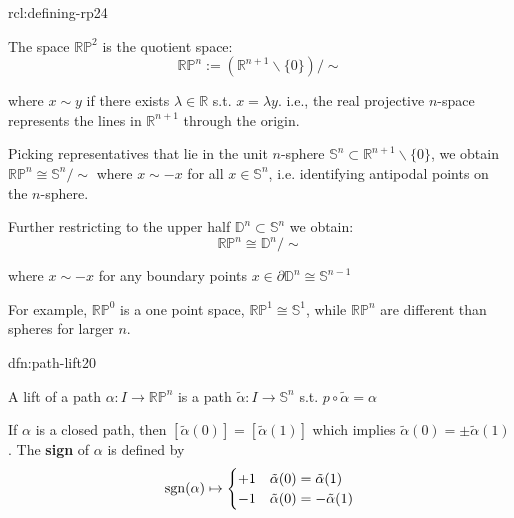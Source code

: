 \documentclass[landscape, 8pt]{extarticle}
\begin{document}
\begin{multicols*}{3}

\vspace{-7pt}
\begin{rcl}{rcl:defining-rp2}{4}
	\vspace{-2pt}
	\begin{enumerate-zero}
	    \item The space $\mathbb{RP}^{2}$ is the quotient space:
			\[\mathbb{RP}^{n} := (\mathbb{R}^{n+1} \backslash \{0\}) / \sim\]
			\par\vspace{-5pt}
			where $x \sim y$ if there exists $\lambda \in \mathbb{R}$ s.t. $x = \lambda y$. i.e., the real projective $n$-space represents the lines in $\mathbb{R}^{n+1}$ through the origin.
			\item Picking representatives that lie in the unit $n$-sphere $\mathbb{S}^{n} \subset \mathbb{R}^{n+1} \backslash \{0\}$, we obtain
				$\mathbb{RP}^{n} \cong \mathbb{S}^{n} / \sim$
				where $x \sim -x$ for all $x\in \mathbb{S}^{n}$, i.e. identifying antipodal points on the $n$-sphere.
			\item Further restricting to the upper half $\mathbb{D}^{n} \subset \mathbb{S}^{n}$ we obtain:
				\[\mathbb{RP}^{n} \cong \mathbb{D}^{n} / \sim\]
				\par\vspace{-6pt}
				where $x \sim -x$ for any boundary points $x\in \partial \mathbb{D}^{n} \cong \mathbb{S}^{n-1}$
	\end{enumerate-zero}
	\vspace{-5pt}
	\tcbline
	\vspace{-1.5pt}
	For example, $\mathbb{RP}^{0}$ is a one point space, $\mathbb{RP}^{1} \cong \mathbb{S}^{1}$, while $\mathbb{RP}^{n}$ are different than spheres for larger $n$.
\end{rcl}

\vspace{-7pt}
\begin{dfn}{dfn:path-lift}{20}
	\begin{itemize-zero}
	    \item A lift of a path $\alpha : I \to \mathbb{RP}^{n}$ is a path $\tilde{\alpha} : I \to \mathbb{S}^{n}$ s.t. $p \circ \tilde{\alpha} = \alpha$
	    \item If $\alpha$ is a closed path, then $[\tilde{\alpha}(0)] = [\tilde{\alpha}(1)]$ which implies $\tilde{\alpha}(0) = \pm \tilde{\alpha}(1)$. The \textbf{sign} of $\alpha$ is defined by
			\[\operatorname{sgn}(\alpha) \mapsto \begin{cases}
				+1 & \tilde{\alpha}(0) = \tilde{\alpha}(1) \\
				-1 & \tilde{\alpha}(0) = -\tilde{\alpha}(1)
			\end{cases}\]
	\end{itemize-zero}


\end{dfn}
\end{multicols*}
\end{document}
